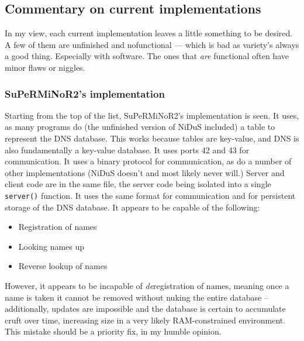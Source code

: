 \documentclass[]{report}
\begin{document}
\subsection{Commentary on current implementations}
In my view, each current implementation leaves a little something to be desired.  A few of them are unfinished and nofunctional --- which is bad as variety's always a good thing. Especially with software. The ones that \emph{are} functional often have minor flaws or niggles. \subsubsection{SuPeRMiNoR2's implementation}
Starting from the top of the list, SuPeRMiNoR2's implementation is seen. It uses, as many programs do (the unfinished version of NiDuS included) a table to represent the DNS database. This works because tables are key-value, and DNS is also fundamentally a key-value database. It uses ports 42 and 43 for communication. It uses a binary protocol for communication, as do a number of other implementations (NiDuS doesn't and most likely never will.) Server and client code are in the same file, the server code being isolated into a single \texttt{server()} function. It uses the same format for communication and for persistent storage of the DNS database. It appears to be capable of the following:
\begin{itemize}
	\item Registration of names
	\item Looking names up
	\item Reverse lookup of names
\end{itemize}
However, it appears to be incapable of \emph{de}registration of names, meaning once a name is taken it cannot be removed without nuking the entire database -- additionally, updates are impossible and the database is certain to accumulate cruft over time, increasing size in a very likely RAM-constrained environment. This mistake should be a priority fix, in my humble opinion.
\appendix
\end{document}
